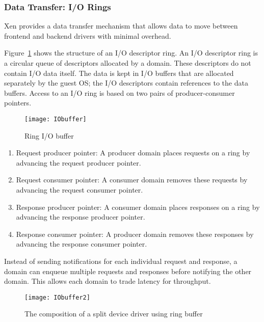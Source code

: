 \subsubsection*{Data Transfer: I/O Rings}
\label{subsec:io rings}
Xen provides a data transfer mechanism that allows data to move
between frontend and backend drivers with minimal overhead.

Figure~\ref{fig:Ring buffer} shows the structure of an I/O descriptor
ring. An I/O descriptor ring is a circular queue of descriptors allocated
by a domain. These descriptors do not contain I/O data itself. The data is kept in I/O buffers
that are allocated separately by the guest OS; the I/O descriptors contain 
references to the data buffers.  Access to an I/O ring is based on two pairs
of producer-consumer pointers.

\begin{figure}[!ht]
\centering
\texttt{[image: IObuffer]}
\caption{Ring I/O buffer}
\label{fig:Ring buffer}
\end{figure}

\begin{enumerate}
\item Request producer pointer: A producer domain places requests on a
ring by advancing the request producer pointer.

\item Request consumer pointer: A consumer domain removes these requests
by advancing the request consumer pointer.

\item Response producer pointer: A consumer domain places responses on
a ring by advancing the response producer pointer.

\item Response consumer pointer: A producer domain removes these responses
by advancing the response consumer pointer.

\end{enumerate} 

Instead of sending notifications for each individual request and response,
a domain can enqueue multiple requests and responses before notifying
the other domain. This allows each domain to trade latency for throughput.

\begin{figure}[!ht]
\centering
\texttt{[image: IObuffer2]}
\caption{The composition of a split device driver using ring buffer}
\label{fig:Ring buffer2}
\end{figure}

